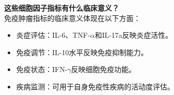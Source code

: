 \documentclass[UTF8]{ctexart}
\begin{document}
\begin{tcolorbox}[
    enhanced,
    colback=lightpurple!10, %
    colframe=white,  %
    arc=3mm,
    boxrule=0.5pt,
    width=\textwidth,
    top=8pt,
    bottom=8pt
]
{\small{\color{lightpurple}\faQuestionCircle}\quad \textbf{这些细胞因子指标有什么临床意义？}\\
{\color{orange!50}\faComments}\quad 免疫肿瘤指标的临床意义体现在以下方面：
\begin{itemize}
    \item 炎症评估：IL-6、TNF-$\alpha$和IL-17a反映炎症活性。
    \item 免疫调节：IL-10水平反映免疫抑制能力。
    \item 免疫状态：IFN-$\gamma$反映细胞免疫功能。
    \item 疾病监测：可用于自身免疫性疾病的活动度评估。
\end{itemize}
}
\end{tcolorbox}
\vspace{-0.5cm}
\end{document}
